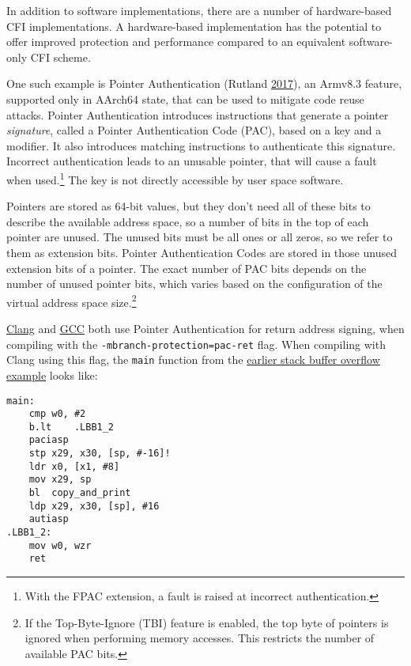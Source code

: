 \documentclass[a4paper,]{report}
\begin{document}
In addition to software implementations, there are a number of
hardware-based CFI implementations. A hardware-based implementation has
the potential to offer improved protection and performance compared to
an equivalent software-only CFI scheme.

One such example is Pointer Authentication
(Rutland \protect\hyperlink{ref-Rutland2017}{2017}), an Armv8.3 feature,
supported only in AArch64 state, that can be used to mitigate code reuse
attacks. Pointer Authentication introduces instructions that generate a
pointer \emph{signature}, called a Pointer Authentication Code (PAC),
based on a key and a modifier. It also introduces matching instructions
to authenticate this signature. Incorrect authentication leads to an
unusable pointer, that will cause a fault when used.\footnote{With the
  FPAC extension, a fault is raised at incorrect authentication.} The
key is not directly accessible by user space software.

Pointers are stored as 64-bit values, but they don't need all of these
bits to describe the available address space, so a number of bits in the
top of each pointer are unused. The unused bits must be all ones or all
zeros, so we refer to them as extension
bits. Pointer Authentication Codes are
stored in those unused extension bits of a pointer. The exact number of
PAC bits depends on the number of unused pointer bits, which varies
based on the configuration of the virtual address space size.\footnote{If
  the Top-Byte-Ignore (TBI) feature is
  enabled, the top byte of pointers is ignored when performing memory
  accesses. This restricts the number of available PAC bits.}

\href{https://clang.llvm.org/docs/ClangCommandLineReference.html\#aarch64}{Clang}
and \href{https://gcc.gnu.org/onlinedocs/gcc/AArch64-Options.html}{GCC}
both use Pointer Authentication for return address signing, when
compiling with the \texttt{-mbranch-protection=pac-ret} flag. When
compiling with Clang using this flag, the \texttt{main} function from
the \protect\hyperlink{stack-buffer-overflow}{earlier stack buffer
overflow example} looks like:

\begin{verbatim}
main:
    cmp w0, #2
    b.lt    .LBB1_2
    paciasp
    stp x29, x30, [sp, #-16]!
    ldr x0, [x1, #8]
    mov x29, sp
    bl  copy_and_print
    ldp x29, x30, [sp], #16
    autiasp
.LBB1_2:
    mov w0, wzr
    ret
\end{verbatim}
\end{document}
